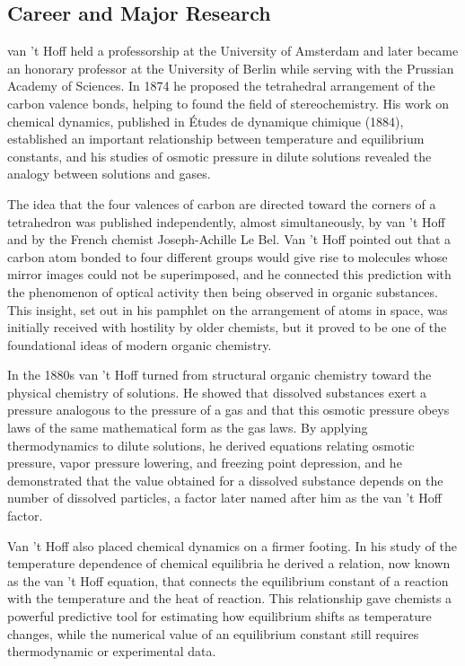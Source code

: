 \subsection*{Career and Major Research}

van 't Hoff held a professorship at the University of Amsterdam and later became an honorary professor at the University of Berlin while serving with the Prussian Academy of Sciences. In 1874 he proposed the tetrahedral arrangement of the carbon valence bonds, helping to found the field of stereochemistry. His work on chemical dynamics, published in Études de dynamique chimique (1884), established an important relationship between temperature and equilibrium constants, and his studies of osmotic pressure in dilute solutions revealed the analogy between solutions and gases.

The idea that the four valences of carbon are directed toward the corners of a tetrahedron was published independently, almost simultaneously, by van 't Hoff and by the French chemist Joseph-Achille Le Bel. Van 't Hoff pointed out that a carbon atom bonded to four different groups would give rise to molecules whose mirror images could not be superimposed, and he connected this prediction with the phenomenon of optical activity then being observed in organic substances. This insight, set out in his pamphlet on the arrangement of atoms in space, was initially received with hostility by older chemists, but it proved to be one of the foundational ideas of modern organic chemistry.

In the 1880s van 't Hoff turned from structural organic chemistry toward the physical chemistry of solutions. He showed that dissolved substances exert a pressure analogous to the pressure of a gas and that this osmotic pressure obeys laws of the same mathematical form as the gas laws. By applying thermodynamics to dilute solutions, he derived equations relating osmotic pressure, vapor pressure lowering, and freezing point depression, and he demonstrated that the value obtained for a dissolved substance depends on the number of dissolved particles, a factor later named after him as the van 't Hoff factor.

Van 't Hoff also placed chemical dynamics on a firmer footing. In his study of the temperature dependence of chemical equilibria he derived a relation, now known as the van 't Hoff equation, that connects the equilibrium constant of a reaction with the temperature and the heat of reaction. This relationship gave chemists a powerful predictive tool for estimating how equilibrium shifts as temperature changes, while the numerical value of an equilibrium constant still requires thermodynamic or experimental data.

